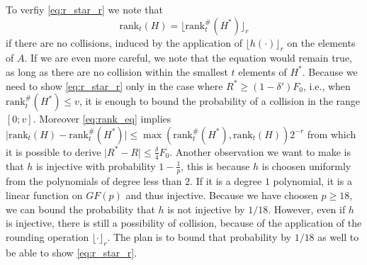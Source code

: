 \documentclass[11pt,a4paper]{article}
\newcommand{\size}[1]{\lvert#1\rvert}
\begin{document}
To verfiy \autoref{eq:r_star_r} we note that
\begin{equation}
    \label{eq:rank_eq}
    \mathrm{rank}_t(H) = \lfloor \mathrm{rank}_t^{\#}(H^*) \rfloor_r
\end{equation}
if there are no collisions, induced by the application of $\lfloor h(\cdot) \rfloor_r$ on the elements of $A$.
If we are even more careful, we note that the equation would remain true, as long as there are no collision within the smallest $t$ elements of $H^*$.
Because we need to show \autoref{eq:r_star_r} only in the case where $R^* \geq (1-\delta') F_0$, i.e., when $\mathrm{rank}_t^{\#}(H^*) \leq v$,
it is enough to bound the probability of a collision in the range $[0; v]$.
Moreover \autoref{eq:rank_eq} implies $\size{\mathrm{rank}_t(H) - \mathrm{rank}_t^{\#}(H^*)} \leq \max(\mathrm{rank}_t^{\#}(H^*), \mathrm{rank}_t(H)) 2^{-r}$ from
which it is possible to derive $\size{R^*-R} \leq \frac{\delta}{4} F_0$.
%
Another observation we want to make is that $h$ is injective with probability $1-\frac{1}{p}$, this is because $h$ is choosen uniformly from the polynomials of degree less than $2$.
If it is a degree $1$ polynomial, it is a linear function on $GF(p)$ and thus injective.
Because we have choosen $p \geq 18$, we can bound the probability that $h$ is not injective by $1/18$.
However, even if $h$ is injective, there is still a possibility of collision, because of the application of the rounding operation $\lfloor \cdot \rfloor_r$. 
The plan is to bound that probability by $1/18$ as well to be able to show \autoref{eq:r_star_r}.
\end{document}
